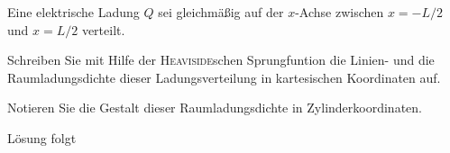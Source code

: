 \documentclass{atistandalonetask}
\begin{document}
  \begin{atiTask}[
    title = Füllung eines Tankwagens
  ]
  
  Eine elektrische Ladung $Q$ sei gleichmäßig auf der $x$-Achse zwischen $x=-L/2$ und $x=L/2$ verteilt.
    \begin{atiSubtasks}
    	\item Schreiben Sie mit Hilfe der \textsc{Heaviside}schen Sprungfuntion die Linien- und die Raumladungsdichte dieser Ladungsverteilung in kartesischen Koordinaten auf.
    	\item Notieren Sie die Gestalt dieser Raumladungsdichte in Zylinderkoordinaten.
    \end{atiSubtasks}	
  \end{atiTask}
  \begin{atiSolution}
   	Lösung folgt
  \end{atiSolution}
\end{document}
